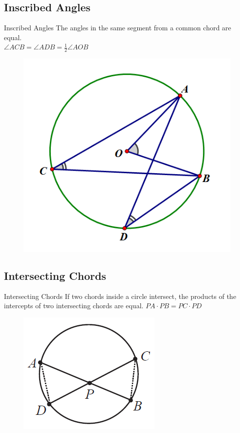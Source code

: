 \documentclass{beamer}
\begin{document}
\subsection{Inscribed Angles}
\begin{frame}{Inscribed Angles}
The angles in the same segment from a common chord are equal.\\
$\angle ACB = \angle ADB = \frac{1}{2}\angle AOB$

\begin{figure}[h!]
	\centering
	\includegraphics[height=0.5\textheight]{Graphics/Week_13/InscribedAngles.png}
\end{figure}
\end{frame}

\subsection{Intersecting Chords}
\begin{frame}{Intersecting Chords}
If two chords inside a circle intersect, the products of the intercepts of two intersecting chords are equal. $PA \cdot PB = PC \cdot PD$

\begin{figure}[h!]
	\centering
	\includegraphics[height=0.5\textheight]{Graphics/Week_13/IntersectingChords.png}
\end{figure}
\end{frame}
\end{document}
